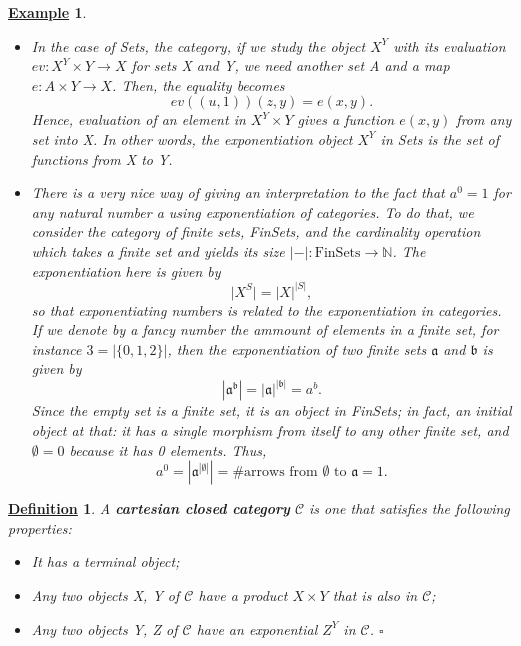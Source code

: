 \documentclass{article}
\newtheorem*{def*}{\underline{Definition}}
\newtheorem{example}{\underline{Example}}
\begin{document}
\begin{example}
	\begin{itemize}
		\item[1)] In the case of Sets, the category, if we study the object \(X^{Y}\) with its evaluation \(ev:X^{Y}\times Y\rightarrow X\) for sets X and Y, we need another set A and a map \(e:A\times Y\rightarrow X\). Then, the equality becomes
		      \[
			      ev((u, 1))(z, y) = e(x, y).
		      \]
		      Hence, evaluation of an element in \(X^{Y}\times Y\) gives a function \(e(x, y)\) from any set into X. In other words, the exponentiation object \(X^{Y}\) in Sets is the set of functions from X to Y.
		\item[2)] There is a very nice way of giving an interpretation to the fact that \(a^{0}=1\) for any natural number a using exponentiation of categories. To do that, we consider the category of finite sets, FinSets, and the cardinality operation which takes a finite set and yields its size \(|-|:\mathrm{FinSets}\rightarrow \mathbb{N}\). The exponentiation here is given by
		      \[
			      \bigl\vert X^{S} \bigr\vert = |X|^{|S|},
		      \]
		      so that exponentiating numbers is related to the exponentiation in categories. If we denote by a fancy number the ammount of elements in a finite set, for instance \(\mathfrak{3} = |\{0, 1, 2\}|\), then the exponentiation of two finite sets \(\mathfrak{a}\) and \(\mathfrak{b}\) is given by
		      \[
			      |\mathfrak{a}^{\mathfrak{b}}| = |\mathfrak{a}|^{|\mathfrak{b}|} = a^{b}.
		      \]
		      Since the empty set is a finite set, it is an object in FinSets; in fact, an initial object at that: it has a single morphism from itself to any other finite set, and \(\emptyset = \mathfrak{0}\) because it has 0 elements. Thus,
		      \[
			      a^{0} = |\mathfrak{a}^{|\emptyset |}| = \#\text{arrows from }\emptyset\text{ to }\mathfrak{a} = 1.
		      \]
	\end{itemize}
\end{example}

\begin{def*}
	A \textbf{cartesian closed category} \(\mathcal{C}\) is one that satisfies the following properties:
	\begin{itemize}
		\item[1)] It has a \textit{terminal object};
		\item[2)] Any two objects X, Y of \(\mathcal{C}\) have a product \(X\times Y\) that is also in \(\mathcal{C}\);
		\item[3)] Any two objects Y, Z of \(\mathcal{C}\) have an \textit{exponential} \(Z^{Y}\) in \(\mathcal{C}\). \(\square\)
	\end{itemize}
\end{def*}
\end{document}
